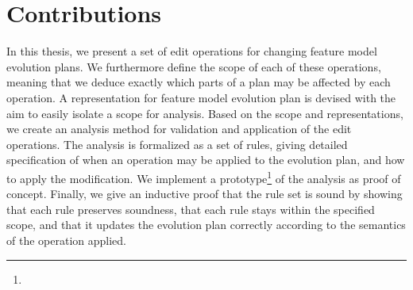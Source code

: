 \section{Contributions}

In this thesis, we present a set of edit operations for changing feature model evolution plans. We furthermore define the scope of each of these operations, meaning that we deduce exactly which parts of a plan may be affected by each operation. A representation for feature model evolution plan is devised with the aim to easily isolate a scope for analysis. Based on the scope and representations, we create an analysis method for validation and application of the edit operations. The analysis is formalized as a set of rules, giving detailed specification of when an operation may be applied to the evolution plan, and how to apply the modification. We implement a prototype\footnote{} of the analysis as proof of concept. Finally, we give an inductive proof that the rule set is sound by showing that each rule preserves soundness, that each rule stays within the specified scope, and that it updates the evolution plan correctly according to the semantics of the operation applied.
